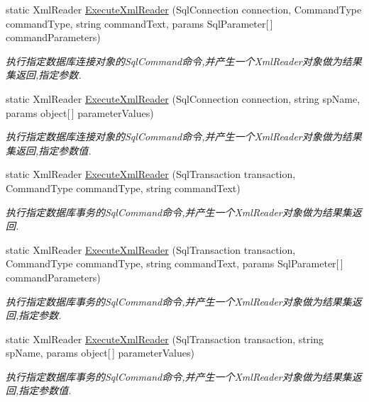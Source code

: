 \begin{DoxyCompactItemize}
static Xml\+Reader \hyperlink{class_x_c_l_net_tools_1_1_data_base_1_1_m_s_s_q_l_1_1_sql_helper_ac7970d46deb6fa5d221863553ab3bf61}{Execute\+Xml\+Reader} (Sql\+Connection connection, Command\+Type command\+Type, string command\+Text, params Sql\+Parameter\mbox{[}$\,$\mbox{]} command\+Parameters)
\begin{DoxyCompactList}\small\item\em 执行指定数据库连接对象的\+Sql\+Command命令,并产生一个\+Xml\+Reader对象做为结果集返回,指定参数. \end{DoxyCompactList}\item 
static Xml\+Reader \hyperlink{class_x_c_l_net_tools_1_1_data_base_1_1_m_s_s_q_l_1_1_sql_helper_a35fe37ce15a3a35ae57115ec3f1f2602}{Execute\+Xml\+Reader} (Sql\+Connection connection, string sp\+Name, params object\mbox{[}$\,$\mbox{]} parameter\+Values)
\begin{DoxyCompactList}\small\item\em 执行指定数据库连接对象的\+Sql\+Command命令,并产生一个\+Xml\+Reader对象做为结果集返回,指定参数值. \end{DoxyCompactList}\item 
static Xml\+Reader \hyperlink{class_x_c_l_net_tools_1_1_data_base_1_1_m_s_s_q_l_1_1_sql_helper_accb62cca14e5aafed4dc7ac1158baafc}{Execute\+Xml\+Reader} (Sql\+Transaction transaction, Command\+Type command\+Type, string command\+Text)
\begin{DoxyCompactList}\small\item\em 执行指定数据库事务的\+Sql\+Command命令,并产生一个\+Xml\+Reader对象做为结果集返回. \end{DoxyCompactList}\item 
static Xml\+Reader \hyperlink{class_x_c_l_net_tools_1_1_data_base_1_1_m_s_s_q_l_1_1_sql_helper_a51e6d1104cc8108d3f06564a22daab7e}{Execute\+Xml\+Reader} (Sql\+Transaction transaction, Command\+Type command\+Type, string command\+Text, params Sql\+Parameter\mbox{[}$\,$\mbox{]} command\+Parameters)
\begin{DoxyCompactList}\small\item\em 执行指定数据库事务的\+Sql\+Command命令,并产生一个\+Xml\+Reader对象做为结果集返回,指定参数. \end{DoxyCompactList}\item 
static Xml\+Reader \hyperlink{class_x_c_l_net_tools_1_1_data_base_1_1_m_s_s_q_l_1_1_sql_helper_a1e648d5bc5a910f07379d5f63b623393}{Execute\+Xml\+Reader} (Sql\+Transaction transaction, string sp\+Name, params object\mbox{[}$\,$\mbox{]} parameter\+Values)
\begin{DoxyCompactList}\small\item\em 执行指定数据库事务的\+Sql\+Command命令,并产生一个\+Xml\+Reader对象做为结果集返回,指定参数值. \end{DoxyCompactList}\item 

\end{DoxyCompactItemize}
